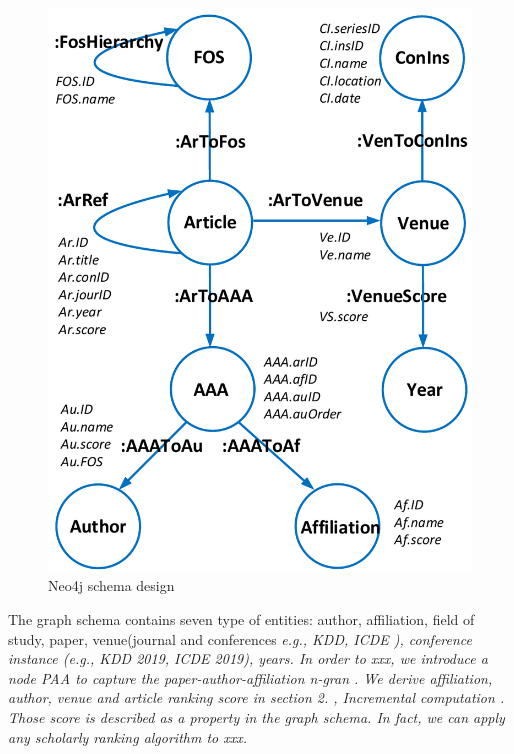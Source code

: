 \begin{figure}
\centering
\includegraphics[width=\columnwidth]{neo4jSchema.pdf}
\caption{Neo4j schema design}
\label{fig:schema}
\end{figure}

\par
The graph schema contains seven type of entities: author, affiliation, field of study, paper, venue(journal and conferences \itshape e.g., \upshape KDD, ICDE ), conference instance (\itshape e.g., \upshape KDD 2019, ICDE 2019), years. In order to xxx, we introduce a node PAA to capture the paper-author-affiliation n-gran .  We derive affiliation, author, venue and article ranking score in section 2. , Incremental computation \cite{ma2018query} . Those score is described as a property in the graph schema. In fact, we can apply any scholarly ranking algorithm to xxx.









